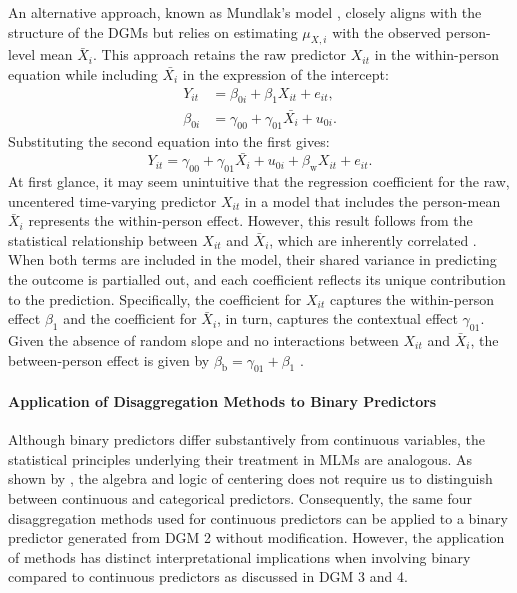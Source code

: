\documentclass[stu]{apa7}
\begin{document}
An alternative approach, known as Mundlak’s model \parencite{mundlak_pooling_1978}, closely aligns with the structure of the DGMs but relies on estimating $\mu_{X,i}$ with the observed person-level mean $\bar{X}_i$. This approach retains the raw predictor $X_{it}$ in the within-person equation while including $\bar{X_i}$ in the expression of the intercept:
\begin{align}
Y_{it} &= \beta_{0i} + \beta_1 X_{it} + e_{it}, \\
\beta_{0i} &= \gamma_{00} + \gamma_{01} \bar{X_i} + u_{0i}.
\end{align}
Substituting the second equation into the first gives:
\begin{equation}
\label{eqn:method-M3-linear}
Y_{it} = \gamma_{00} + \gamma_{01} \bar{X_i} + u_{0i} + \beta_\text{w} X_{it} + e_{it}.
\end{equation}
At first glance, it may seem unintuitive that the regression coefficient for the raw, uncentered time-varying predictor \( X_{it} \) in a model that includes the person-mean \( \bar{X}_i \) represents the within-person effect. However, this result follows from the statistical relationship between \( X_{it} \) and \( \bar{X}_i \), which are inherently correlated \parencite[cf.][]{hoffman_longitudinal_2015}. When both terms are included in the model, their shared variance in predicting the outcome is partialled out, and each coefficient reflects its unique contribution to the prediction. Specifically, the coefficient for \( X_{it} \) captures the within-person effect \( \beta_\text{1} \) and the coefficient for \( \bar{X}_i \), in turn, captures the contextual effect \( \gamma_{01} \). Given the absence of random slope and no interactions between  \( X_{it} \) and \( \bar{X}_i \), the between-person effect is given by \(   \beta_\text{b} = \gamma_{01} +  \beta_\text{1}\) \parencite{raudenbush_hierarchical_2002}.

\paragraph{Application of Disaggregation Methods to Binary Predictors}

Although binary predictors differ substantively from continuous variables, the statistical principles underlying their treatment in MLMs are analogous. As shown by \textcite{enders_centering_2007}, the algebra and logic of centering does not require us to distinguish between continuous and categorical predictors. Consequently, the same four disaggregation methods used for continuous predictors can be applied to a binary predictor generated from DGM 2 without modification. However, the application of methods has distinct interpretational implications when involving binary compared to continuous predictors as discussed in DGM 3 and 4.
\end{document}
